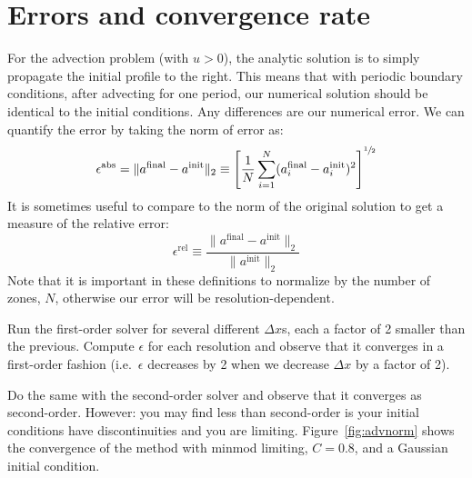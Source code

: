 \section{Errors and convergence rate}

For the advection problem (with $u>0$), the analytic solution is to
simply propagate the initial profile to the right.  This means that
with periodic boundary conditions, after advecting for one period, our
numerical solution should be identical to the initial conditions.  Any
differences are our numerical error.  We can quantify the error by
taking the norm of error as: 
\begin{equation}
\epsilon^\mathrm{abs} = \| a^\mathrm{final} - a^\mathrm{init} \|_2 \equiv
   \left [ \frac{1}{N} \sum_{i=1}^N 
   ( a_i^\mathrm{final} - a_i^\mathrm{init} )^2
  \right ]^{\sfrac{1}{2}}
\end{equation}
It is sometimes useful to compare to the norm of the original solution
to get a measure of the relative error:
\begin{equation}
\epsilon^\mathrm{rel} \equiv \frac{\| a^\mathrm{final} - a^\mathrm{init} \|_2}
   {\| a^\mathrm{init} \|_2}
\end{equation}
Note that it is important in these definitions to normalize by the number
of zones, $N$, otherwise our error will be resolution-dependent.
%
\begin{exercise}
{ Run the first-order solver for several different $\Delta x$s,
each a factor of 2 smaller than the previous.  Compute $\epsilon$ for
each resolution and observe that it converges in a first-order fashion
(i.e.\ $\epsilon$ decreases by 2 when we decrease $\Delta x$ by a factor of 2).

\noindent Do the same with the second-order solver and observe that it
converges as second-order. However: you may find less than second-order
is your initial conditions have discontinuities and you are limiting. 
Figure~\ref{fig:advnorm} shows the convergence of the method with minmod
limiting, $C = 0.8$, and a Gaussian initial condition.}
\end{exercise}

